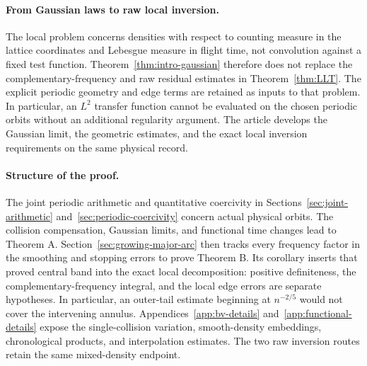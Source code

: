 \documentclass[11pt,reqno]{amsart}
\numberwithin{equation}{section}
\theoremstyle{definition}\newtheorem{definition}[theorem]{Definition}
\theoremstyle{remark}\newtheorem{remark}[theorem]{Remark}
\begin{document}
\paragraph{From Gaussian laws to raw local inversion.}
The local problem concerns densities with respect to counting measure
in the lattice coordinates and Lebesgue measure in flight time, not
convolution against a fixed test function. Theorem~\ref{thm:intro-gaussian}
therefore does not replace the complementary-frequency and raw residual
estimates in Theorem~\ref{thm:LLT}. The explicit periodic geometry
and edge terms are retained as inputs to that problem. In particular,
an $L^2$ transfer function cannot be evaluated on the chosen periodic
orbits without an additional regularity argument. The article develops
the Gaussian limit, the geometric estimates, and the exact local
inversion requirements on the same physical record.

\paragraph{Structure of the proof.}
The joint periodic arithmetic and quantitative coercivity in
Sections~\ref{sec:joint-arithmetic} and~\ref{sec:periodic-coercivity}
concern actual physical orbits. The collision compensation, Gaussian
limits, and functional time changes lead to Theorem A.
Section~\ref{sec:growing-major-arc} then tracks every frequency factor
in the smoothing and stopping errors to prove Theorem B. Its corollary
inserts that proved central band into the exact local decomposition:
positive definiteness, the complementary-frequency integral, and the
local edge errors are separate hypotheses. In particular, an outer-tail
estimate beginning at $n^{-2/5}$ would not cover the intervening annulus.
Appendices~\ref{app:bv-details} and~\ref{app:functional-details} expose
the single-collision variation, smooth-density embeddings,
chronological products, and interpolation estimates. The two raw
inversion routes retain the same mixed-density endpoint.
\end{document}
